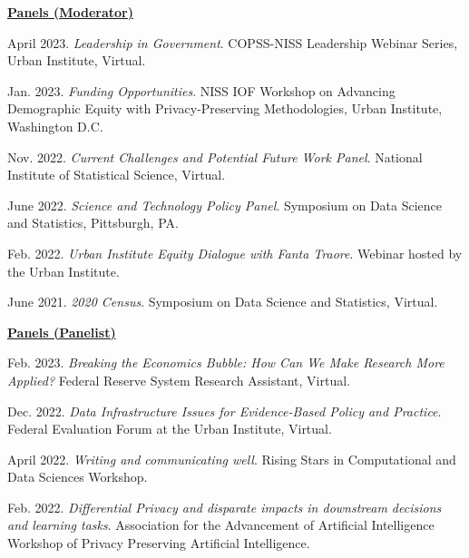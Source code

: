 \begin{etaremune}[topsep=0pt, itemsep=4pt, partopsep=0pt, parsep=0pt]
\vspace{6pt}
\hspace{-0.30in}\underline{\textbf{\large Panels (Moderator)}}\normalsize
    \item April 2023. \textit{Leadership in Government}. COPSS-NISS Leadership Webinar Series, Urban Institute, Virtual.
    
    \item Jan. 2023. \textit{Funding Opportunities}. NISS IOF Workshop on Advancing Demographic Equity with Privacy-Preserving Methodologies, Urban Institute, Washington D.C.
    
    \item Nov. 2022. \textit{Current Challenges and Potential Future Work Panel}. National Institute of Statistical Science, Virtual.
    
    \item June 2022. \textit{Science and Technology Policy Panel}. Symposium on Data Science and Statistics, Pittsburgh, PA.
    
    \item Feb. 2022. \textit{Urban Institute Equity Dialogue with Fanta Traore}. Webinar hosted by the Urban Institute.
    
    \item June 2021. \textit{2020 Census}. Symposium on Data Science and Statistics, Virtual.
    
    \vspace{6pt}
\hspace{-0.30in}\underline{\textbf{\large Panels (Panelist)}}\normalsize
    \item Feb. 2023. \textit{Breaking the Economics Bubble: How Can We Make Research More Applied?} Federal Reserve System Research Assistant, Virtual.
    
    \item Dec. 2022. \textit{Data Infrastructure Issues for Evidence-Based Policy and Practice}. Federal Evaluation Forum at the Urban Institute, Virtual.
    
    \item April 2022. \textit{Writing and communicating well}. Rising Stars in Computational and Data Sciences Workshop.

    \item Feb. 2022. \textit{Differential Privacy and disparate impacts in downstream decisions and learning tasks}. Association for the Advancement of Artificial Intelligence Workshop of Privacy Preserving Artificial Intelligence.
    

\end{etaremune}
